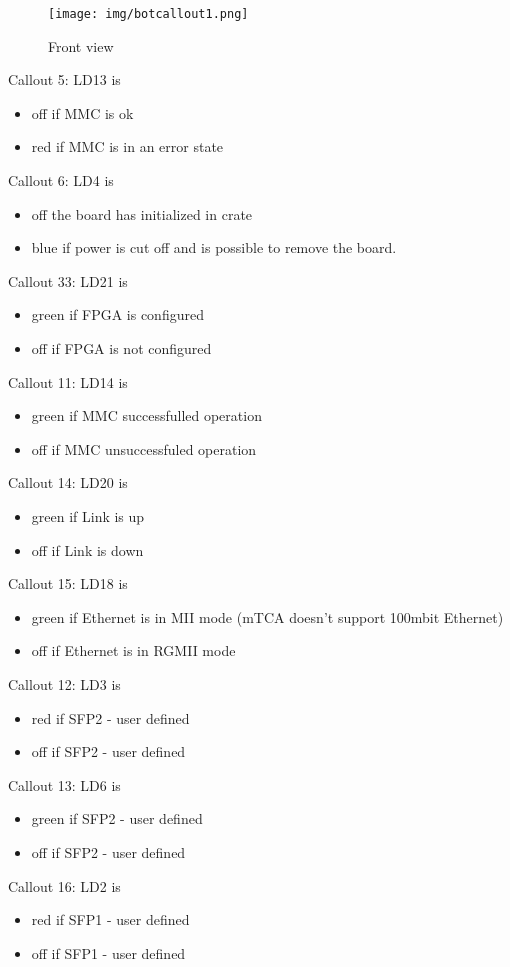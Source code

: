 \clearpage
\begin{figure}[htbp!]
	\centering
	\texttt{[image: img/botcallout1.png]}\\
	\caption{Front view}
\end{figure}

Callout 5: LD13 is
\begin{itemize}
	\item off if MMC is ok 
	\item red if MMC is in an error state
\end{itemize}

Callout 6: LD4 is
\begin{itemize}
	\item off the board has initialized in crate
	\item blue if power is cut off and is possible to remove the board.
\end{itemize}


Callout 33: LD21 is
\begin{itemize}
	\item green if FPGA is configured
	\item off if FPGA is not configured
\end{itemize}

Callout 11: LD14 is
\begin{itemize}
	\item green if MMC successfulled operation
	\item off if MMC unsuccessfuled operation
\end{itemize}

Callout 14: LD20 is
\begin{itemize}
	\item green if Link is up
	\item off if Link is down
\end{itemize}
Callout 15: LD18 is
\begin{itemize}
	\item green if Ethernet is in MII mode (mTCA doesn't support 100mbit Ethernet)
	\item off if Ethernet is in RGMII mode
\end{itemize}
Callout 12: LD3 is
\begin{itemize}
	\item red if SFP2 - user defined
	\item off if SFP2 - user defined
\end{itemize}
Callout 13: LD6 is
\begin{itemize}
	\item green if SFP2 - user defined
	\item off if SFP2 - user defined
\end{itemize}
Callout 16: LD2 is
\begin{itemize}
	\item red if SFP1 - user defined
	\item off if SFP1 - user defined
\end{itemize}

